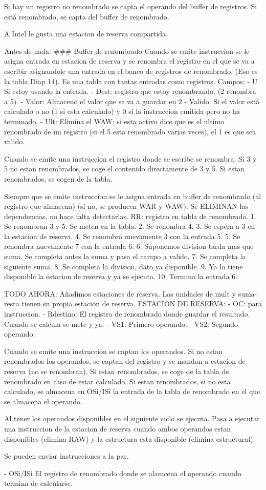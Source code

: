 Si hay un registro no renombrado se capta el operando del buffer de registros.
Si está renombrado, se capta del buffer de renombrado.




A Intel le gusta una estacion de reserva compartida.

Antes de nada:
### Buffer de renombrado
Cuando se emite instruccion se le asigna entrada en estacion de reserva y se renombra el registro en el que se va a escribir asignandole una entrada en el banco de registros de renombrado. (Eso es la tabla Diap 14). Es una tabla con tantas entradas como registros. Campos:
- U Si estoy usando la entrada.
- Dest: registro que estoy renombrando. (2 renombra a 5).
- Valor: Almaceno el valor que se va a guardar en 2
- Valido: Si el valor está calculado o no (1 si esta calculado) y 0 si la instruccion emitida pero no ha terminado.
- Ult: Elimina el WAW: si esta activo dice que es el ultimo renombrado de un registro (si el 5 esta renombrado varias veces), el 1 es que sea valido.

Cuando se emite una instruccion el registro donde se escribe se renombra.
Si 3 y 5 no estan renombrados, se coge el contenido directamente de 3 y 5. Si estan renombrados, se cogen de la tabla.

Siempre que se emite instruccion se le asigna entrada en buffer de renombrado (al registro que almacena) (si no, se producen WAR y WAW). Se ELIMINAN las dependencias, no hace falta detectarlas.
RR: registro en tabla de renombrado.
1. Se renombran 3 y 5. Se meten en la tabla.
2. Se renombra 4.
3. Se espera a 3 en la estacion de reserva.
4. Se renombra nuevamente 3 con la entrada 5.
5. Se renombra nuevamente 7 con la entrada 6.
6. Suponemos division tarda mas que suma. Se completa antes la suma y pasa el campo a valido.
7. Se completa la siguiente suma.
8. Se completa la division, dato ya disponible.
9. Ya lo tiene disponible la estacion de reserva y ya se ejecuta.
10. Termina la entrada 6.

TODO AHORA:
Añadimos estaciones de reserva. Las unidades de mult y suma-resta tienen su propia estacion de reserva.
ESTACION DE RESERVA:
- OC: para instruccion.
- Rdestino: El registro de renombrado donde guardar el resultado. Cuando se calcula se mete y ya.
- VS1: Primero operando.
- VS2: Segundo operando.

Cuando se emite una instruccion se captan los operandos.
Si no estan renombrados los operandos, se captan del registro y se mandan a estacion de reserva (no se renombran).
Si estan renombrados, se coge de la tabla de renombrado en caso de estar calculado.
Si estan renombrados, si no esta calculado, se almacena en OSi/ISi la entrada de la tabla de renombrado en el que se almacena el operando.

Al tener los operandos disponibles en el siguiente ciclo se ejecuta.
Pasa a ejecutar una instruccion de la estacion de reserva cuando ambos operandos estan disponibles (elimina RAW) y la estructura esta disponible (elimina estructural).

Se pueden enviar instrucciones a la par.

- OSi/ISi El registro de renombrado donde se alamcena el operando cuando termina de calcularse.
